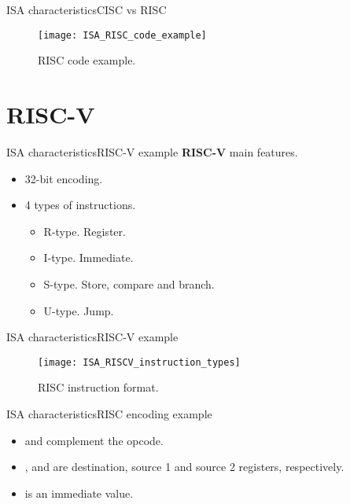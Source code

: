 \documentclass[]{slides}
\begin{document}
\begin{frame}{\acs{ISA} characteristics}{CISC vs RISC}
\vspace{-8pt}
\begin{figure}
\centering
\texttt{[image: ISA\_RISC\_code\_example]}
\vspace{-8pt}
\caption{RISC code example.}
\label{Figure:RISC_code}
\end{figure}    
\end{frame}

\section{RISC-V}	
\begin{frame}{\acs{ISA} characteristics}{RISC-V example}
\textbf{\ac{RISC}-V} main features.
\begin{itemize}
\item 32-bit encoding.
\item 4 types of instructions.
  \begin{itemize}
    \item R-type. Register.
    \item I-type. Immediate.
    \item S-type. Store, compare and branch.
    \item U-type. Jump.
  \end{itemize}
\end{itemize}
\end{frame}

\begin{frame}{\acs{ISA} characteristics}{RISC-V example}
\vspace{-8pt}
\begin{figure}
\centering
\texttt{[image: ISA\_RISCV\_instruction\_types]}
\vspace{-8pt}
\caption{RISC instruction format.}
\label{Figure:RISC_instruction_format}
\end{figure}    
\end{frame}

\begin{frame}{\acs{ISA} characteristics}{RISC encoding example}
\begin{itemize}
\item {} and  complement the opcode.
\item {},  and  are destination, source 1 and source 2 registers, respectively.
\item {} is an immediate value.
\end{itemize}
\end{frame}
\end{document}

